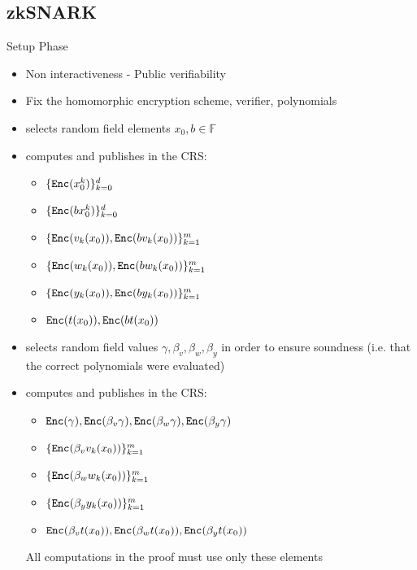 \documentclass[handout]{beamer}
\begin{document}
\subsection{zkSNARK}
\begin{frame}[allowframebreaks]{Setup Phase} 
    \begin{itemize}
        \item Non interactiveness - Public verifiability 
        \item Fix the homomorphic encryption scheme, verifier, polynomials  
        \item \ver selects random field elements $x_0,b \in \mathbb{F}$  
        \item computes and publishes in the CRS:
        \begin{itemize}
            \item $\{ \mathtt{Enc}(x_0^k) \}_{k=0}^d$  
            \item $\{ \mathtt{Enc}(bx_0^k)\}_{k=0}^d$  
            \item $\{ \mathtt{Enc}(v_k(x_0)),\mathtt{Enc}(bv_k(x_0)) \}_{k=1}^m$  
            \item $\{ \mathtt{Enc}(w_k(x_0)),\mathtt{Enc}(bw_k(x_0)) \}_{k=1}^m$  
            \item $\{ \mathtt{Enc}(y_k(x_0)),\mathtt{Enc}(by_k(x_0)) \}_{k=1}^m$  
            \item $\mathtt{Enc}(t(x_0)), \mathtt{Enc}(bt(x_0))$
        \end{itemize} 

        \framebreak

        \item selects random field values $\gamma, \beta_v, \beta_w, \beta_y$ in order to ensure soundness (i.e. that the correct polynomials were evaluated) \pause
        \item computes and publishes in the CRS: \pause
        \begin{itemize}
            \item $\mathtt{Enc}(\gamma), \mathtt{Enc}(\beta_v \gamma), \mathtt{Enc}(\beta_w \gamma), \mathtt{Enc}(\beta_y \gamma)$ \pause
            \item $\{ \mathtt{Enc}( \beta_v v_k(x_0))\}_{k=1}^m$ \pause
            \item $\{ \mathtt{Enc}(\beta_w w_k(x_0))\}_{k=1}^m$ \pause
            \item $\{ \mathtt{Enc}(\beta_y y_k(x_0))\}_{k=1}^m$ \pause
            \item $\mathtt{Enc}(\beta_v t(x_0)), \mathtt{Enc}(\beta_w t(x_0)), \mathtt{Enc}(\beta_y t(x_0))$ \pause
        \end{itemize} 

        All computations in the proof must use only these elements \pause
    \end{itemize}
\end{frame}
\end{document}

